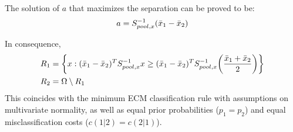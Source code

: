 \documentclass[12pt]{extarticle}
\newcommand{\<}{\langle}
\renewcommand{\>}{\rangle}
\theoremstyle{definition}
\begin{document}
The solution of $a$ that maximizes the separation can be proved to be:
\begin{align*}
    a = S^{-1}_{pool,x}(\Bar{x}_1 -\Bar{x}_2)
\end{align*}

\begin{tcolorbox}[enhanced, drop fuzzy shadow, title=Fisher's DA method]
In consequence,
\begin{align*}
    R_1 &= \bigg\{x: (\Bar{x}_1 -\Bar{x}_2)^T S^{-1}_{pool,x} x \geq (\Bar{x}_1 -\Bar{x}_2)^T S^{-1}_{pool,x} \bigg(\frac{\Bar{x}_1 +\Bar{x}_2}{2}\bigg) \bigg\}\\
    R_2 &= \Omega \setminus R_1
\end{align*}
This coincides with the minimum ECM classification rule with assumptions on multivariate normality, as well as equal prior probabilities ($p_1 = p_2$) and equal misclassification costs ($c(1|2) =c(2|1)$).\\
\end{tcolorbox}
\end{document}
